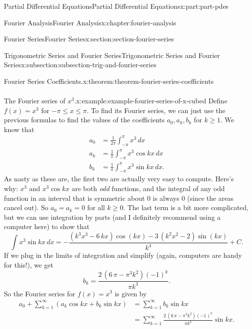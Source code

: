 \documentclass[oneside,10pt,]{book}
\numberwithin{equation}{part}
\newcommand{\amp}{&}
\begin{document}
\begin{partptx}{Partial Differential Equations}{}{Partial Differential Equations}{}{}{x:part:part-pdes}
\begin{chapterptx}{Fourier Analysis}{}{Fourier Analysis}{}{}{x:chapter:fourier-analysis}
\begin{sectionptx}{Fourier Series}{}{Fourier Series}{}{}{x:section:section-fourier-series}
\begin{subsectionptx}{Trigonometric Series and Fourier Series}{}{Trigonometric Series and Fourier Series}{}{}{x:subsection:subsection-trig-and-fourier-series}
\begin{theorem}{Fourier Series Coefficients.}{}{x:theorem:theorem-fourier-series-coefficients}
\begin{align*}
\end{align*}
%
\end{theorem}
\begin{example}{The Fourier series of \(x^{3}\).}{x:example:example-fourier-series-of-x-cubed}%
Define \(f(x) = x^{3}\) for \(-\pi\leq x\leq \pi\). To find its Fourier series, we can just use the previous formulas to find the values of the coefficients \(a_{0},a_{k},b_{k}\) for \(k\geq1\). We know that%
\begin{align*}
a_{0} \amp = \frac{1}{2\pi}\int_{-\pi}^{\pi}x^{3}\,dx\\
a_{k} \amp = \frac{1}{\pi}\int_{-\pi}^{\pi}x^{3}\cos kx\,dx \\
b_{k} \amp = \frac{1}{\pi}\int_{-\pi}^{\pi}x^{3}\sin kx\,dx.
\end{align*}
As nasty as these are, the first two are actually very easy to compute. Here's why: \(x^{3}\) and \(x^{3}\cos kx\) are both \emph{odd} functions, and the integral of any odd function in an interval that is symmetric about \(0\) is always \(0\) (since the areas cancel out). So \(a_{0} = a_{k} = 0\) for all \(k\geq0\). The last term is a bit more complicated, but we can use integration by parts (and I definitely recommend using a computer here) to show that%
\begin{equation*}
\int x^{3}\sin kx\,dx = -\frac{{\left(k^{3} x^{3} - 6 \, k x\right)} \cos\left(k x\right) - 3 \, {\left(k^{2} x^{2} - 2\right)} \sin\left(k x\right)}{k^{4}} + C.
\end{equation*}
If we plug in the limits of integration and simplify (again, computers are handy for this!), we get%
\begin{equation*}
b_{k} = \frac{2 \, {\left(6 \, \pi - \pi^{3} k^{2}\right)} \left(-1\right)^{k}}{\pi k^{3}}.
\end{equation*}
So the Fourier series for \(f(x) = x^{3}\) is given by%
\begin{align*}
a_{0} + \sum_{k=1}^{\infty}(a_{k}\cos kx+b_{k}\sin kx) \amp= \sum_{k=1}^{\infty}b_{k}\sin kx \\
\amp= \sum_{k=1}^{\infty}\frac{2 \, {\left(6 \, \pi - \pi^{3} k^{2}\right)} \left(-1\right)^{k}}{\pi k^{3}}\sin kx. 
\end{align*}
%
\end{example}

\end{subsectionptx}
\end{sectionptx}
\end{chapterptx}
\end{partptx}
\end{document}

